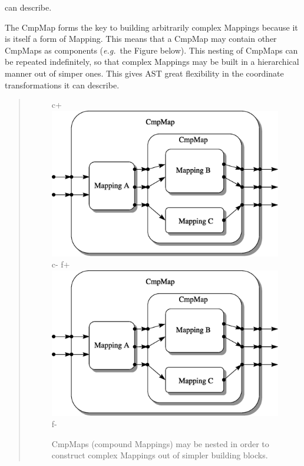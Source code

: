 \documentclass[twoside,11pt]{article}
\newenvironment{latexonly}{}{}
\begin{document}
{\begin{latexonly}
   can describe.
\end{latexonly}
\begin{htmlonly}
   The CmpMap forms the key to building arbitrarily complex Mappings
   because it is itself a form of Mapping. This means that a CmpMap may
   contain other CmpMaps as components ({\em{e.g.}}\ the Figure
   below). This nesting of CmpMaps can be repeated indefinitely, so that
   complex Mappings may be built in a hierarchical manner out of simper
   ones.  This gives AST great flexibility in the coordinate
   transformations it can describe.
   \begin{quote}
   \begin{figure}
   \label{fig:complexcmpmap}
c+
   \includegraphics[scale=0.8]{sun211_figures/complex.eps}
c-
f+
   \includegraphics[scale=0.8]{sun210_figures/complex.eps}
f-
   \caption{CmpMaps (compound Mappings) may be nested in order to
   construct complex Mappings out of simpler building blocks.}
   \end{figure}
   \end{quote}
\end{htmlonly}

}
\end{document}
